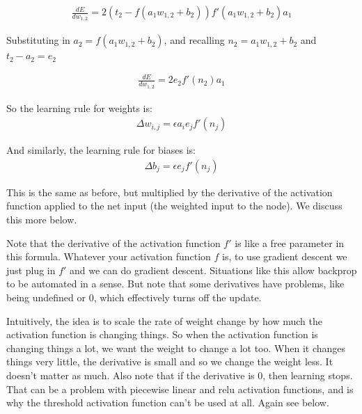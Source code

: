 \begin{eqnarray*}
\frac{dE}{dw_{1,2}} = 2 (t_2 - f(a_1w_{1,2} + b_2)) f'(a_1w_{1,2} + b_2) a_1 
\end{eqnarray*}

Substituting in $a_2 = f(a_1w_{1,2} + b_2)$, and recalling $n_2 = a_1w_{1,2} + b_2$  and $t_2 - a_2 = e_2$ 

\begin{eqnarray*}
\frac{dE}{dw_{1,2}}  = 2 e_2 f'(n_2) a_1 
\end{eqnarray*}

So the learning rule for weights is:
\begin{eqnarray*}
\Delta w_{i,j}  =  \epsilon a_i e_j f'(n_j)
\end{eqnarray*}

And similarly, the learning rule for biases is:
\begin{eqnarray*}
\Delta b_{j}  =  \epsilon e_j f'(n_j)
\end{eqnarray*} 

This is the same as before, but multiplied by the derivative of the activation function applied to the net input (the weighted input to the node). We discuss this more below. 

Note that the derivative of the activation function $f'$ is like a free parameter in this formula. Whatever your activation function $f$ is, to use gradient descent we just plug in $f'$ and we can do gradient descent. Situations like this allow backprop to be automated in a sense. But note that some derivatives have problems, like being undefined or 0, which effectively turns off the update.

Intuitively, the idea is to scale the rate of weight change by how much the activation function is changing things. So when the activation function is changing things a lot, we want the weight to change a lot too. When it changes things very little, the derivative is small and so we change the weight less. It doesn't matter as much. Also note that if the derivative is 0, then learning stops. That can be a problem with piecewise linear and relu activation functions, and is why the threshold activation function can't be used at all. Again see below.

